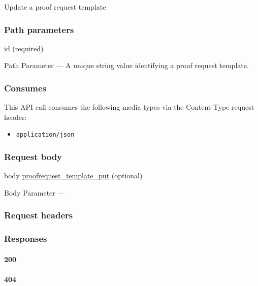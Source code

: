 Update a proof request template

\hypertarget{path-parameters-95}{%
\subsubsection{Path parameters}\label{path-parameters-95}}

id (required)

{Path Parameter} --- A unique string value identifying a proof request
template.

\hypertarget{consumes-54}{%
\subsubsection{Consumes}\label{consumes-54}}

This API call consumes the following media types via the {Content-Type}
request header:

\begin{itemize}
\tightlist
\item
  \texttt{application/json}
\end{itemize}

\hypertarget{request-body-54}{%
\subsubsection{Request body}\label{request-body-54}}

body
\protect\hyperlink{proofrequest_template_put}{proofrequest\_template\_put}
(optional)

{Body Parameter} ---

\hypertarget{request-headers-97}{%
\subsubsection{Request headers}\label{request-headers-97}}

\hypertarget{responses-176}{%
\subsubsection{Responses}\label{responses-176}}

\hypertarget{section-567}{%
\paragraph{200}\label{section-567}}

\protect\hyperlink{}{}

\hypertarget{section-568}{%
\paragraph{404}\label{section-568}}

